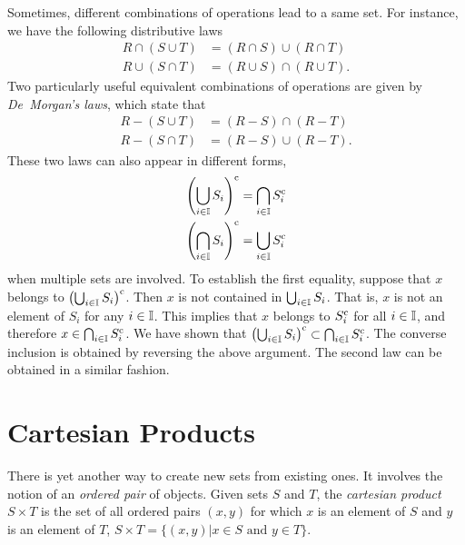 Sometimes, different combinations of operations lead to a same set.
For instance, we have the following distributive laws
\begin{align*}
R \cap (S \cup T) &= (R \cap S) \cup (R \cap T) \\
R \cup (S \cap T) &= (R \cup S) \cap (R \cup T).
\end{align*}
Two particularly useful equivalent combinations of operations are given by \emph{De~Morgan's laws}, which state that
\begin{align*}
R - (S \cup T) &= (R - S) \cap (R - T) \\
R - (S \cap T) &= (R - S) \cup (R - T).
\end{align*}
These two laws can also appear in different forms,
\begin{align*}
\left( \bigcup_{i \in \mathbb{I}} S_{i} \right)^{\mathrm{c}}
&= \bigcap_{i \in \mathbb{I}} S_{i}^{\mathrm{c}} \\
\left( \bigcap_{i \in \mathbb{I}} S_{i} \right)^{\mathrm{c}}
&= \bigcup_{i \in \mathbb{I}} S_{i}^{\mathrm{c}}
\end{align*}
when multiple sets are involved.
To establish the first equality, suppose that $x$ belongs to $\left( \bigcup_{i \in \mathbb{I}} S_{i} \right)^{\mathrm{c}}$.
Then $x$ is not contained in $\bigcup_{i \in \mathbb{I}} S_{i}$.
That is, $x$ is not an element of $S_{i}$ for any $i \in \mathbb{I}$.
This implies that $x$ belongs to $S_{i}^{\mathrm{c}}$ for all $i \in \mathbb{I}$, and therefore $x \in \bigcap_{i \in \mathbb{I}} S_{i}^{\mathrm{c}}$.
We have shown that $\left( \bigcup_{i \in \mathbb{I}} S_{i} \right)^{\mathrm{c}} \subset \bigcap_{i \in \mathbb{I}} S_{i}^{\mathrm{c}}$.
The converse inclusion is obtained by reversing the above argument.
The second law can be obtained in a similar fashion.


\section{Cartesian Products}

There is yet another way to create new sets from existing ones.
It involves the notion of an \emph{ordered pair} of objects.
Given sets $S$ and $T$, the \emph{cartesian product} $S \times T$ is the set of all ordered pairs $(x, y)$ for which $x$ is an element of $S$ and $y$ is an element of $T$, $S \times T = \{ (x, y) | x \in S \text{ and } y \in T \}$.

